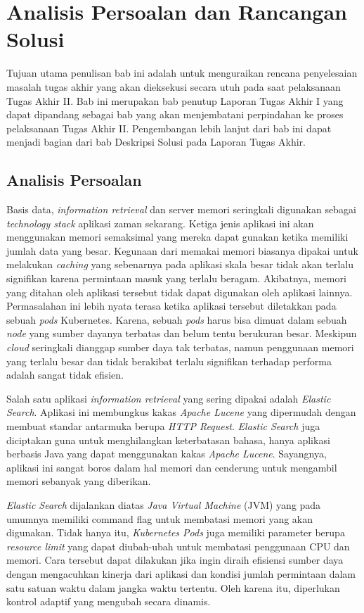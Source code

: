 \chapter{Analisis Persoalan dan Rancangan Solusi}

Tujuan utama penulisan bab ini adalah untuk menguraikan rencana penyelesaian masalah tugas akhir yang akan dieksekusi secara utuh pada saat pelaksanaan Tugas Akhir II. Bab ini merupakan bab penutup Laporan Tugas Akhir I yang dapat dipandang sebagai bab yang akan menjembatani perpindahan ke proses pelaksanaan Tugas Akhir II. Pengembangan lebih lanjut dari bab ini dapat menjadi bagian dari bab Deskripsi Solusi pada Laporan Tugas Akhir.

\section{Analisis Persoalan}

Basis data, \textit{information retrieval} dan server memori seringkali digunakan sebagai \textit{technology stack} aplikasi zaman sekarang.
Ketiga jenis aplikasi ini akan menggunakan memori semaksimal yang mereka dapat gunakan ketika memiliki jumlah data yang besar.
Kegunaan dari memakai memori biasanya dipakai untuk melakukan \textit{caching} yang sebenarnya pada aplikasi skala besar tidak akan terlalu signifikan karena permintaan masuk yang terlalu beragam. 
Akibatnya, memori yang ditahan oleh aplikasi tersebut tidak dapat digunakan oleh aplikasi lainnya.
Permasalahan ini lebih nyata terasa ketika aplikasi tersebut diletakkan pada sebuah \textit{pods} Kubernetes. Karena, sebuah \textit{pods} harus bisa dimuat dalam sebuah \textit{node} yang sumber dayanya terbatas dan belum tentu berukuran besar. Meskipun \textit{cloud} seringkali dianggap sumber daya tak terbatas, namun penggunaan memori yang terlalu besar dan tidak berakibat terlalu signifikan terhadap performa adalah sangat tidak efisien.

Salah satu aplikasi \textit{information retrieval} yang sering dipakai adalah \textit{Elastic Search}. 
Aplikasi ini membungkus kakas \textit{Apache Lucene} yang dipermudah dengan membuat standar antarmuka berupa \textit{HTTP Request}.
\textit{Elastic Search} juga diciptakan guna untuk menghilangkan keterbatasan bahasa, hanya aplikasi berbasis Java yang dapat menggunakan kakas \textit{Apache Lucene}.
Sayangnya, aplikasi ini sangat boros dalam hal memori dan cenderung untuk mengambil memori sebanyak yang diberikan.

\textit{Elastic Search} dijalankan diatas \textit{Java Virtual Machine} (JVM) yang pada umumnya memiliki command flag untuk membatasi memori yang akan digunakan. Tidak hanya itu, \textit{Kubernetes Pods} juga memiliki parameter berupa \textit{resource limit} yang dapat diubah-ubah untuk membatasi penggunaan CPU dan memori. Cara tersebut dapat dilakukan jika ingin diraih efisiensi sumber daya dengan mengacuhkan kinerja dari aplikasi dan kondisi jumlah permintaan dalam satu satuan waktu dalam jangka waktu tertentu. Oleh karena itu, diperlukan kontrol adaptif yang mengubah secara dinamis.

